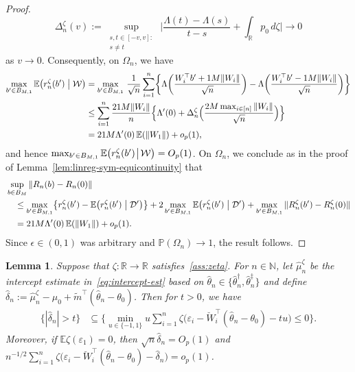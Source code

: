 \documentclass[a4paper]{article}
\newcommand{\N}{\mathbb{N}}
\newcommand{\R}{\mathbb{R}}
\newcommand{\E}{\mathbb{E}}
\renewcommand{\Pr}{\mathbb{P}}
\newcommand{\norm}[1]{\|{#1}\|}
\newtheorem{lemma}[theorem]{Lemma}
\theoremstyle{definition}
\begin{document}
\begin{proof}
\begin{equation}
\label{eq:zeta-Lambda-deriv}
\Delta_n^\zeta(v) := \sup_{\substack{s,t \in [-v,v] : \\ s \neq t}}\,\biggl|\frac{\Lambda(t) - \Lambda(s)}{t - s} + \int_\R p_0\,d\zeta\biggr| \to 0
\end{equation}
as $v \to 0$. Consequently, on $\Omega_n$, we have
\begin{align*}
\max_{b' \in B_{M,\epsilon}}\E\bigl(r_n^\zeta(b') \bigm| \mathcal{W}\bigr) &= \max_{b' \in B_{M,\epsilon}}\,\frac{1}{\sqrt{n}}\sum_{i=1}^n \biggl\{\Lambda\biggl(\frac{W_i^\top b' + \epsilon M\norm{W_i}}{\sqrt{n}}\biggr) - \Lambda\biggl(\frac{W_i^\top b' - \epsilon M\norm{W_i}}{\sqrt{n}}\biggr)\biggr\} \\
&\leq \sum_{i=1}^n\frac{2\epsilon M\norm{W_i}}{n}\Bigl\{\Lambda'(0) + \Delta_n^\zeta\Bigl(\frac{2M\max_{i \in [n]}\norm{W_i}}{\sqrt{n}}\Bigr)\Bigr\} \\
&= 2\epsilon M\Lambda'(0)\,\E(\norm{W_1}) + o_p(1),
\end{align*}
and hence $\max_{b' \in B_{M,\epsilon}}\E\bigl(r_n^\zeta(b')\!\bigm|\!\mathcal{W}\bigr) = O_p(1)$. On $\Omega_n$, we conclude as in the proof of Lemma~\ref{lem:linreg-sym-equicontinuity} that
\begin{align*}
&\sup_{b \in B_M}\norm{R_n(b) - R_n(0)} \\
&\quad \leq \max_{b' \in B_{M,\epsilon}} \bigl\{r_n^\zeta(b') - \E\bigl(r_n^\zeta(b') \bigm| \mathcal{D}'\bigr)\bigr\} + 2\max_{b' \in B_{M,\epsilon}}\E\bigl(r_n^\zeta(b') \bigm| \mathcal{D}'\bigr) + \max_{b' \in B_{M,\epsilon}}\norm{R_n^\zeta(b') - R_n^\zeta(0)} \\
&\quad = 2\epsilon M\Lambda'(0)\,\E(\norm{W_1}) + o_p(1).
\end{align*}
Since $\epsilon \in (0,1)$ was arbitrary and $\Pr(\Omega_n) \to 1$, the result follows.
\end{proof}
\begin{lemma}
\label{lem:linreg-zeta-consistency}
Suppose that $\zeta \colon \R \to \R$ satisfies~\emph{\ref{ass:zeta}}. For $n \in \N$, let $\hat{\mu}_n^\zeta$ be the intercept estimate in~\eqref{eq:intercept-est} based on $\hat{\theta}_n \in \{\hat{\theta}_n^\dagger,\hat{\theta}_n^\ddagger\}$ and define $\hat{\delta}_n := \hat{\mu}_n^\zeta - \mu_0 + \tilde{m}^\top(\hat{\theta}_n - \theta_0)$. Then for $t > 0$, we have
\begin{align}
\label{eq:linreg-zeta-event}
\bigl\{|\hat{\delta}_n| > t\bigr\} &\subseteq \biggl\{\min_{u \in \{-1,1\}} u\sum_{i=1}^n \zeta\bigl(\varepsilon_i - \breve{W}_i^\top(\hat{\theta}_n - \theta_0) - tu\bigr) \leq 0\biggr\}.
\end{align}
Moreover, if $\E\zeta(\varepsilon_1) = 0$, then $\sqrt{n}\hat{\delta}_n  = O_p(1)$ and $n^{-1/2}\sum_{i=1}^n \zeta\bigl(\varepsilon_i - \breve{W}_i^\top(\hat{\theta}_n - \theta_0) - \hat{\delta}_n\bigr) = o_p(1)$.
\end{lemma}
\end{document}
